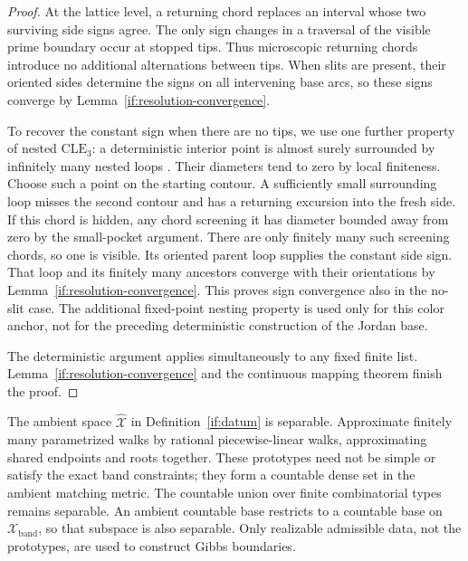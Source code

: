 \begin{proof}
At the lattice level, a returning chord replaces an interval whose
two surviving side signs agree.  The only sign changes in a traversal
of the visible prime boundary occur at stopped tips.  Thus microscopic
returning chords introduce no additional alternations between tips.
When slits are present, their oriented sides determine the signs on
all intervening base arcs, so these signs converge by
Lemma~\ref{if:resolution-convergence}.

To recover the constant sign when there are no tips, we use one further
property of nested $\mathrm{CLE}_3$: a deterministic interior point is
almost surely surrounded by infinitely many nested loops
\cite[Section~1, before Proposition~1]{SSW2009}. Their diameters tend to
zero by local finiteness. Choose such a point on the starting contour.
A sufficiently small surrounding loop misses the second contour and
has a returning excursion into the fresh side. If this chord is hidden,
any chord screening it has diameter bounded away from zero by the
small-pocket argument. There are only finitely many such screening
chords, so one is visible. Its oriented parent loop supplies the constant
side sign. That loop and its finitely many ancestors converge with their
orientations by Lemma~\ref{if:resolution-convergence}. This proves sign
convergence also in the no-slit case. The additional fixed-point nesting
property is used only for this color anchor, not for the preceding
deterministic construction of the Jordan base.

The deterministic argument applies simultaneously to any fixed finite
list.  Lemma~\ref{if:resolution-convergence} and the continuous mapping
theorem finish the proof.
\end{proof}

\begin{remark}\label{if:metric-separable}
The ambient space $\widehat{\mathcal X}$ in Definition~\ref{if:datum}
is separable. Approximate finitely many parametrized walks by rational
piecewise-linear walks, approximating shared endpoints and roots
together. These prototypes need not be simple or satisfy the exact
band constraints; they form a countable dense set in the ambient
matching metric. The countable union over finite combinatorial types
remains separable. An ambient countable base restricts to a countable
base on $\mathcal X_{\mathrm{band}}$, so that subspace is also
separable. Only realizable admissible data, not the prototypes, are
used to construct Gibbs boundaries.
\end{remark}
